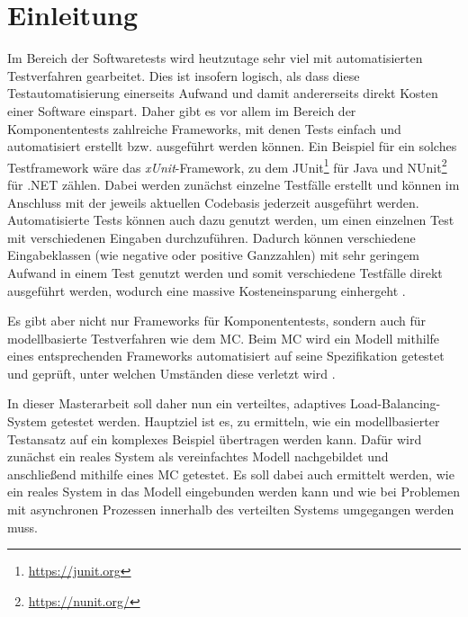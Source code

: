 \chapter{Einleitung}\label{sec:einleitung}

Im Bereich der Softwaretests wird heutzutage sehr viel mit automatisierten Testverfahren gearbeitet. Dies ist insofern logisch, als dass diese Testautomatisierung einerseits Aufwand und damit andererseits direkt Kosten einer Software einspart. Daher gibt es vor allem im Bereich der Komponententests zahlreiche Frameworks, mit denen Tests einfach und automatisiert erstellt bzw. ausgeführt werden können. Ein Beispiel für ein solches Testframework wäre das \emph{xUnit}-Framework, zu dem \uA JUnit\footnote{\url{https://junit.org}} für Java und NUnit\footnote{\url{https://nunit.org/}} für .NET zählen. Dabei werden zunächst einzelne Testfälle erstellt und können im Anschluss mit der jeweils aktuellen Codebasis jederzeit ausgeführt werden. Automatisierte Tests können auch dazu genutzt werden, um einen einzelnen Test mit verschiedenen Eingaben durchzuführen. Dadurch können verschiedene Eingabeklassen (wie negative oder positive Ganzzahlen) mit sehr geringem Aufwand in einem Test genutzt werden und somit verschiedene Testfälle direkt ausgeführt werden, wodurch eine massive Kosteneinsparung einhergeht \cite{Polo2013}.

Es gibt aber nicht nur Frameworks für Komponententests, sondern auch für modellbasierte Testverfahren wie \zB dem \ac{MC}. Beim \ac{MC} wird ein Modell mithilfe eines entsprechenden Frameworks automatisiert auf seine Spezifikation getestet und geprüft, unter welchen Umständen diese verletzt wird \cite{Grumberg1999,Habermaier2015}.

In dieser Masterarbeit soll daher nun ein verteiltes, adaptives Load-Balancing-System getestet werden. Hauptziel ist es, zu ermitteln, wie ein modellbasierter Testansatz auf ein komplexes Beispiel übertragen werden kann. Dafür wird zunächst ein reales System als vereinfachtes Modell nachgebildet und anschließend mithilfe eines \ac{MC} getestet. Es soll dabei auch ermittelt werden, wie ein reales System in das Modell eingebunden werden kann und wie bei Problemen mit asynchronen Prozessen innerhalb des verteilten Systems umgegangen werden muss.

